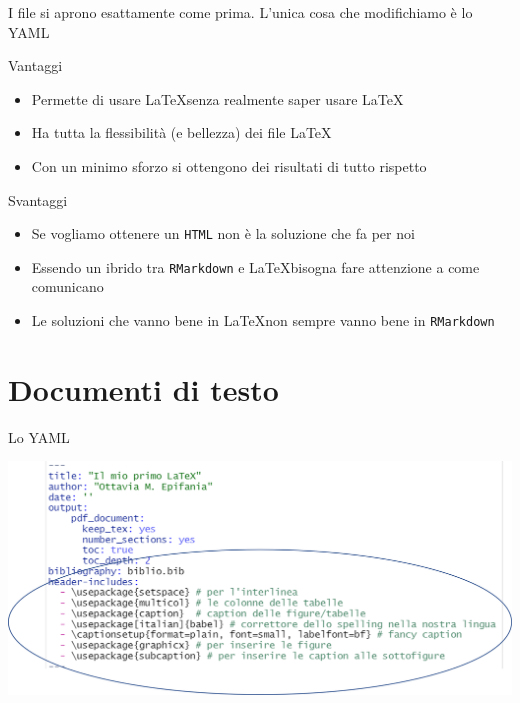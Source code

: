 \documentclass[
  ignorenonframetext,
]{beamer}
\begin{document}
\begin{frame}{}
\protect\hypertarget{section-1}{}
I file si aprono esattamente come prima. L'unica cosa che modifichiamo è
lo YAML

\begin{exampleblock}{Vantaggi}

\begin{itemize}
\item
  Permette di usare \LaTeX senza realmente saper usare \LaTeX
\item
  Ha tutta la flessibilità (e bellezza) dei file \LaTeX
\item
  Con un minimo sforzo si ottengono dei risultati di tutto rispetto
\end{itemize}

\end{exampleblock}

\pause

\vspace{5mm}

\begin{alertblock}{Svantaggi}

\begin{itemize}
\item
  Se vogliamo ottenere un \texttt{HTML} non è la soluzione che fa per
  noi
\item
  Essendo un ibrido tra \texttt{RMarkdown} e \LaTeX bisogna fare
  attenzione a come comunicano
\item
  Le soluzioni che vanno bene in \LaTeX non sempre vanno bene in
  \texttt{RMarkdown}
\end{itemize}

\end{alertblock}
\end{frame}

\hypertarget{documenti-di-testo}{%
\section{Documenti di testo}\label{documenti-di-testo}}

\begin{frame}{Lo YAML}
\protect\hypertarget{lo-yaml}{}
\begin{center}\includegraphics[width=1\linewidth]{img/yaml} \end{center}
\end{frame}
\end{document}
